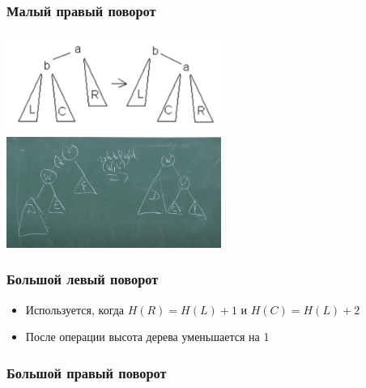 \subsubsection*{Малый правый поворот}
{\includegraphics[width=7cm]{images/40-42_6.png}}
{\includegraphics[width=7cm]{images/40-42_srr.PNG}}


\subsubsection*{Большой левый поворот}

\begin{itemize}
    \item Используется, когда $H(R) = H(L) + 1$ и $H(C) = H(L) + 2$
    \item После операции высота дерева уменьшается на 1
\end{itemize}

\begin{figure}[h]
\end{figure}

\subsubsection*{Большой правый поворот}
\begin{figure}[h]
\end{figure}

